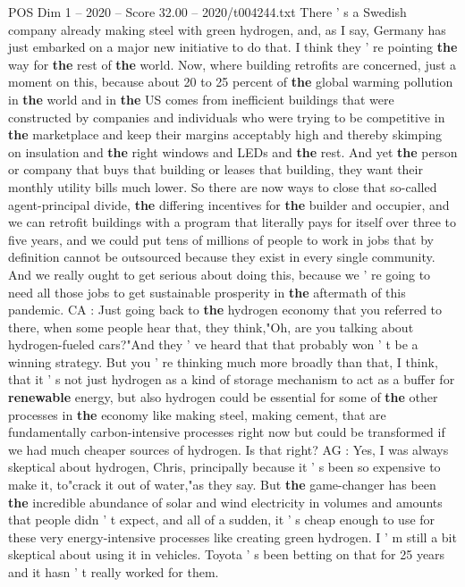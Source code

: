 \begin{textsample}{POS Dim 1 – 2020 – Score 32.00 – 2020/t004244.txt}
There ' s a Swedish company already making steel with green hydrogen, and, as I say, Germany has just embarked on a major new initiative to do that.
I think they ' re pointing \textbf{the} way for \textbf{the} rest of \textbf{the} world.
Now, where building retrofits are concerned, just a moment on this, because about 20 to 25 percent of \textbf{the} global warming pollution in \textbf{the} world and in \textbf{the} US comes from inefficient buildings that were constructed by companies and individuals who were trying to be competitive in \textbf{the} marketplace and keep their margins acceptably high and thereby skimping on insulation and \textbf{the} right windows and LEDs and \textbf{the} rest.
And yet \textbf{the} person or company that buys that building or leases that building, they want their monthly utility bills much lower.
So there are now ways to close that so-called agent-principal divide, \textbf{the} differing incentives for \textbf{the} builder and occupier, and we can retrofit buildings with a program that literally pays for itself over three to five years, and we could put tens of millions of people to work in jobs that by definition cannot be outsourced because they exist in every single community.
And we really ought to get serious about doing this, because we ' re going to need all those jobs to get sustainable prosperity in \textbf{the} aftermath of this pandemic.
CA : Just going back to \textbf{the} hydrogen economy that you referred to there, when some people hear that, they think,"Oh, are you talking about hydrogen-fueled cars?"And they ' ve heard that that probably won ' t be a winning strategy.
But you ' re thinking much more broadly than that, I think, that it ' s not just hydrogen as a kind of storage mechanism to act as a buffer for \textbf{renewable} energy, but also hydrogen could be essential for some of \textbf{the} other processes in \textbf{the} economy like making steel, making cement, that are fundamentally carbon-intensive processes right now but could be transformed if we had much cheaper sources of hydrogen.
Is that right?
AG : Yes, I was always skeptical about hydrogen, Chris, principally because it ' s been so expensive to make it, to"crack it out of water,"as they say.
But \textbf{the} game-changer has been \textbf{the} incredible abundance of solar and wind electricity in volumes and amounts that people didn ' t expect, and all of a sudden, it ' s cheap enough to use for these very energy-intensive processes like creating green hydrogen.
I ' m still a bit skeptical about using it in vehicles.
Toyota ' s been betting on that for 25 years and it hasn ' t really worked for them.

\end{textsample}
